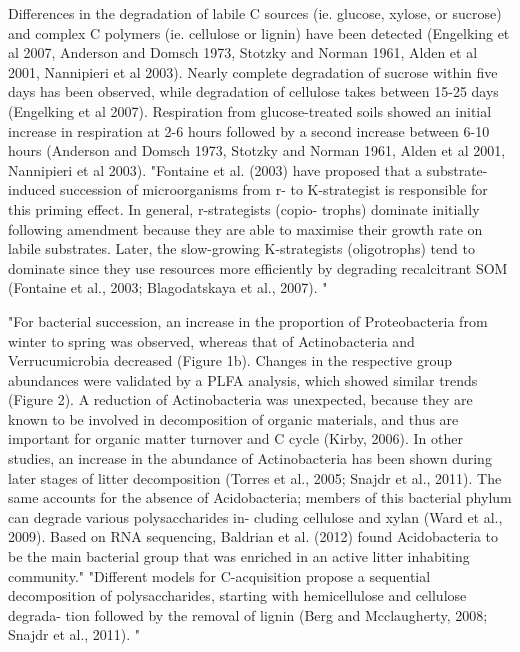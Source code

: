 Differences in the degradation of labile C sources (ie. glucose, xylose, or sucrose) and complex C polymers (ie. cellulose or lignin) have been detected (Engelking et al 2007, Anderson and Domsch 1973, Stotzky and Norman 1961, Alden et al 2001, Nannipieri et al 2003).  Nearly complete degradation of sucrose within five days has been observed, while degradation of cellulose takes between 15-25 days (Engelking et al 2007).  Respiration from glucose-treated soils showed an initial increase in respiration at 2-6 hours followed by a second increase between 6-10 hours (Anderson and Domsch 1973, Stotzky and Norman 1961, Alden et al 2001, Nannipieri et al 2003).  
"Fontaine et al. (2003) have proposed that a substrate- induced succession of microorganisms from r- to K-strategist is responsible for this priming effect. In general, r-strategists (copio- trophs) dominate initially following amendment because they are able to maximise their growth rate on labile substrates. Later, the slow-growing K-strategists (oligotrophs) tend to dominate since they use resources more efficiently by degrading recalcitrant SOM
(Fontaine et al., 2003; Blagodatskaya et al., 2007). " \cite{Jenkins_2010}




"For bacterial succession, an increase in the proportion of Proteobacteria from winter to spring was observed, whereas that of Actinobacteria and Verrucumicrobia decreased (Figure 1b). Changes in the respective group abundances were validated by a PLFA analysis, which showed similar trends (Figure 2). A reduction of Actinobacteria was unexpected, because they are known to be involved in decomposition of organic materials, and thus are important for organic matter turnover and C cycle (Kirby, 2006). In other studies, an increase in the abundance of Actinobacteria has been shown during later stages of litter decomposition (Torres et al., 2005; Snajdr et al., 2011). The same accounts for the absence of Acidobacteria; members of this bacterial phylum can degrade various polysaccharides in- cluding cellulose and xylan (Ward et al., 2009). Based on RNA sequencing, Baldrian et al. (2012) found Acidobacteria to be the main bacterial group that was enriched in an active litter inhabiting community." 
"Different models for C-acquisition propose a sequential decomposition of polysaccharides, starting with hemicellulose and cellulose degrada- tion followed by the removal of lignin (Berg and Mcclaugherty, 2008; Snajdr et al., 2011). " \cite{Schneider_2012}  




